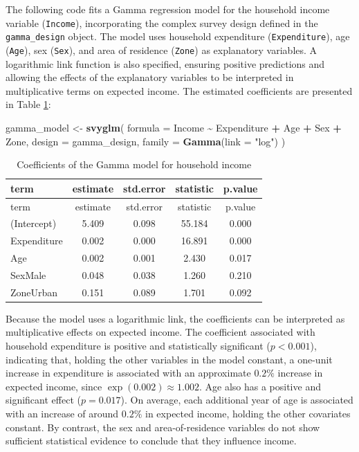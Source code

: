 \documentclass[
  english,
  12pt,
]{book}
\newenvironment{Shaded}{\begin{snugshade}}{\end{snugshade}}
\newcommand{\AttributeTok}[1]{\textcolor[rgb]{0.13,0.29,0.53}{#1}}
\newcommand{\FunctionTok}[1]{\textcolor[rgb]{0.13,0.29,0.53}{\textbf{#1}}}
\newcommand{\NormalTok}[1]{#1}
\newcommand{\OtherTok}[1]{\textcolor[rgb]{0.56,0.35,0.01}{#1}}
\newcommand{\SpecialCharTok}[1]{\textcolor[rgb]{0.81,0.36,0.00}{\textbf{#1}}}
\newcommand{\StringTok}[1]{\textcolor[rgb]{0.31,0.60,0.02}{#1}}
\begin{document}
The following code fits a Gamma regression model for the household income variable (\texttt{Income}), incorporating the complex survey design defined in the \texttt{gamma\_design} object. The model uses household expenditure (\texttt{Expenditure}), age (\texttt{Age}), sex (\texttt{Sex}), and area of residence (\texttt{Zone}) as explanatory variables. A logarithmic link function is also specified, ensuring positive predictions and allowing the effects of the explanatory variables to be interpreted in multiplicative terms on expected income. The estimated coefficients are presented in Table \ref{tab:tab-gamma-coeficientes}:

\begin{Shaded}
\begin{Highlighting}[]
\NormalTok{gamma\_model }\OtherTok{\textless{}{-}} \FunctionTok{svyglm}\NormalTok{(}
  \AttributeTok{formula =}\NormalTok{ Income }\SpecialCharTok{\textasciitilde{}}\NormalTok{ Expenditure }\SpecialCharTok{+}\NormalTok{ Age }\SpecialCharTok{+}\NormalTok{ Sex }\SpecialCharTok{+}\NormalTok{ Zone,}
  \AttributeTok{design =}\NormalTok{ gamma\_design,}
  \AttributeTok{family =} \FunctionTok{Gamma}\NormalTok{(}\AttributeTok{link =} \StringTok{"log"}\NormalTok{)}
\NormalTok{)}
\end{Highlighting}
\end{Shaded}

\begin{longtable}[]{@{}lcccc@{}}
\caption{\label{tab:tab-gamma-coeficientes}Coefficients of the Gamma model for household income}\tabularnewline
\toprule\noalign{}
term & estimate & std.error & statistic & p.value \\
\midrule\noalign{}
\endfirsthead
\toprule\noalign{}
term & estimate & std.error & statistic & p.value \\
\midrule\noalign{}
\endhead
\bottomrule\noalign{}
\endlastfoot
(Intercept) & 5.409 & 0.098 & 55.184 & 0.000 \\
Expenditure & 0.002 & 0.000 & 16.891 & 0.000 \\
Age & 0.002 & 0.001 & 2.430 & 0.017 \\
SexMale & 0.048 & 0.038 & 1.260 & 0.210 \\
ZoneUrban & 0.151 & 0.089 & 1.701 & 0.092 \\
\end{longtable}

Because the model uses a logarithmic link, the coefficients can be interpreted as multiplicative effects on expected income. The coefficient associated with household expenditure is positive and statistically significant (\(p<0.001\)), indicating that, holding the other variables in the model constant, a one-unit increase in expenditure is associated with an approximate \(0.2\%\) increase in expected income, since \(\exp(0.002)\approx 1.002\). Age also has a positive and significant effect (\(p=0.017\)). On average, each additional year of age is associated with an increase of around \(0.2\%\) in expected income, holding the other covariates constant. By contrast, the sex and area-of-residence variables do not show sufficient statistical evidence to conclude that they influence income.
\end{document}
